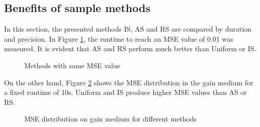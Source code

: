 \subsection{Benefits of sample methods}
In this section, the presented methods IS, AS and RS are compared by duration
and precision.
In Figure \ref{graphic:methods_compare}, the runtime to reach an
MSE value of 0.01 was measured. It is evident that AS and RS perform
much better than Uniform or IS. 
\begin{figure}[H]
  \centerline{
    }
  \caption{Methods with same MSE value}
  \label{graphic:methods_compare}
\end{figure}
On the other hand, Figure \ref{graphic:methods_compare2} shows the MSE
distribution in the gain medium for a fixed runtime of 10s. Uniform and IS 
produce higher MSE values than AS or RS.
\begin{figure}[H]
  \centerline{
    }
  \caption{MSE distribution on gain medium for different methods}
  \label{graphic:methods_compare2}
\end{figure}
